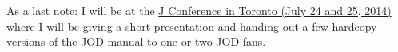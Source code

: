 As a last note: I will be at the
\href{http://www.jsoftware.com/jwiki/Community/Conference2014}{J
Conference in Toronto (July 24 and 25, 2014)} where I will be giving a
short presentation and handing out a few hardcopy versions of the JOD
manual to one or two JOD fans.




%